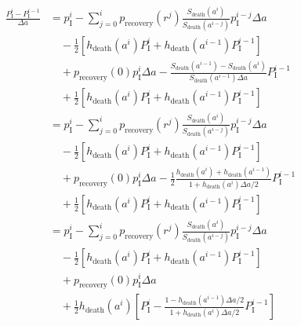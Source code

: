 \documentclass[12pt]{article}
\begin{document}
\begin{equation}
  \begin{split}
    \frac{P_{\mathrm{I}}^i - P_{\mathrm{I}}^{i - 1}}{\Delta a}
    &= p_{\mathrm{I}}^i
    - \sum_{j = 0}^i p_{\text{recovery}}(r^j)
    \frac{S_{\text{death}}(a^i)}{S_{\text{death}}(a^{i - j})}
    p_{\mathrm{I}}^{i - j} \Delta a
    \\ & \quad {}
    - \frac{1}{2} \left[h_{\text{death}}(a^i) P_{\mathrm{I}}^i
      + h_{\text{death}}(a^{i - 1}) P_{\mathrm{I}}^{i - 1}\right]
    \\ & \quad {}
    + p_{\text{recovery}}(0) p_{\mathrm{I}}^i \Delta a
    - \frac{S_{\text{death}}(a^{i - 1}) - S_{\text{death}}(a^i)}
    {S_{\text{death}}(a^{i - 1}) \Delta a}
    P_{\mathrm{I}}^{i - 1}
    \\ & \quad {}
    + \frac{1}{2} \left[h_{\text{death}}(a^i) P_{\mathrm{I}}^i
      + h_{\text{death}}(a^{i - 1}) P_{\mathrm{I}}^{i - 1}\right]
    \\
    &= p_{\mathrm{I}}^i
    - \sum_{j = 0}^i p_{\text{recovery}}(r^j)
    \frac{S_{\text{death}}(a^i)}{S_{\text{death}}(a^{i - j})}
    p_{\mathrm{I}}^{i - j} \Delta a
    \\ & \quad {}
    - \frac{1}{2} \left[h_{\text{death}}(a^i) P_{\mathrm{I}}^i
      + h_{\text{death}}(a^{i - 1}) P_{\mathrm{I}}^{i - 1}\right]
    \\ & \quad {}
    + p_{\text{recovery}}(0) p_{\mathrm{I}}^i \Delta a
    - \frac{1}{2}
    \frac{h_{\text{death}}(a^i) + h_{\text{death}}(a^{i - 1})}
    {1 + h_{\text{death}}(a^i) \Delta a / 2}
    P_{\mathrm{I}}^{i - 1}
    \\ & \quad {}
    + \frac{1}{2} \left[h_{\text{death}}(a^i) P_{\mathrm{I}}^i
      + h_{\text{death}}(a^{i - 1}) P_{\mathrm{I}}^{i - 1}\right]
    \\
    &= p_{\mathrm{I}}^i
    - \sum_{j = 0}^i p_{\text{recovery}}(r^j)
    \frac{S_{\text{death}}(a^i)}{S_{\text{death}}(a^{i - j})}
    p_{\mathrm{I}}^{i - j} \Delta a
    \\ & \quad {}
    - \frac{1}{2} \left[h_{\text{death}}(a^i) P_{\mathrm{I}}^i
      + h_{\text{death}}(a^{i - 1}) P_{\mathrm{I}}^{i - 1}\right]
    \\ & \quad {}
    + p_{\text{recovery}}(0) p_{\mathrm{I}}^i \Delta a
    \\ & \quad {}
    + \frac{1}{2} h_{\text{death}}(a^i)
    \left[P_{\mathrm{I}}^i
      - \frac{1 - h_{\text{death}}(a^{i - 1}) \Delta a / 2}
      {1 + h_{\text{death}}(a^i) \Delta a / 2}
      P_{\mathrm{I}}^{i - 1}\right]

\end{split}
\end{equation}
\end{document}
